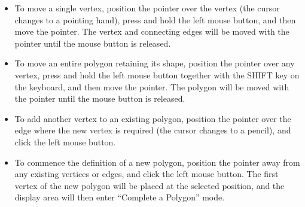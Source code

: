 \documentclass[11pt]{article}
\newcommand{\htmlref}[2]{#1}
\begin{document}
\begin{itemize}

\item To move a single vertex, position the pointer over the vertex (the
cursor changes to a pointing hand), press and hold the left mouse button,
and then move the pointer. The vertex and connecting edges will be moved
with the pointer until the mouse button is released.

\item To move an entire polygon retaining its shape, position the pointer
over any vertex, press and hold the left mouse button together with the
SHIFT key on the keyboard, and then move the pointer. The polygon will be
moved with the pointer until the mouse button is released.

\item To add another vertex to an existing polygon, position the pointer
over the edge where the new vertex is required (the cursor changes to a
pencil), and click the left mouse button.

\item To commence the definition of a new polygon, position the pointer
away from any existing vertices or edges, and click the left mouse button.
The first vertex of the new polygon will be placed at the selected
position, and the display area will then enter ``\htmlref{Complete a
Polygon}{POLKA_MODE_2}'' mode.

\end{itemize}
\end{document}
